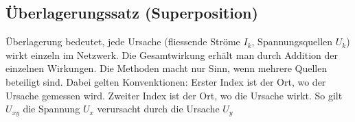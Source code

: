 \subsection{Überlagerungssatz (Superposition)}
Überlagerung bedeutet, jede Ursache (fliessende Ströme $I_k$, Spannungsquellen $U_k$) wirkt einzeln im Netzwerk. Die Gesamtwirkung erhält man durch Addition der einzelnen Wirkungen. Die Methoden macht nur Sinn, wenn mehrere Quellen beteiligt sind.
\newline\newline
Dabei gelten Konvenktionen: Erster Index ist der Ort, wo der Ursache gemessen wird. Zweiter Index ist der Ort, wo die Ursache wirkt. So gilt $U_{xy}$ die Spannung $U_x$ verursacht durch die Ursache $U_y$

















